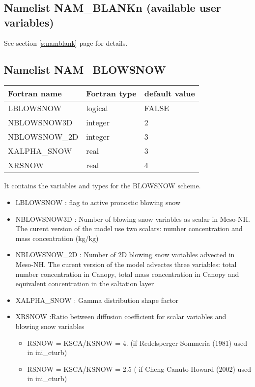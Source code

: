 \subsection{Namelist NAM\_BLANKn (available user variables)}
See section \ref{s:namblank} page \pageref{s:namblank} for details.

\subsection{Namelist NAM\_BLOWSNOW }

\begin{center}
\begin{tabular} {|l|l|l|}
\hline
Fortran name & Fortran type & default value \\
\hline

LBLOWSNOW    & logical & FALSE     \\
NBLOWSNOW3D  & integer & 2         \\
NBLOWSNOW\_2D& integer & 3       \\
XALPHA\_SNOW & real    &3 \\
XRSNOW       & real    & 4\\
\hline
\end{tabular}
\end{center}
It contains the variables and types for the BLOWSNOW scheme.

\begin{itemize}
\item LBLOWSNOW : flag to active pronostic blowing snow 
\item NBLOWSNOW3D : Number of blowing snow variables as scalar in Meso-NH. The curent version of the model use two scalars:
number concentration and mass concentration (kg/kg)
\item NBLOWSNOW\_2D :  Number of 2D blowing snow variables advected in Meso-NH. The curent version of the model advectes three variables: total number concentration in Canopy, total mass concentration in Canopy and equivalent concentration in the saltation layer

\item XALPHA\_SNOW : Gamma distribution shape factor
\item XRSNOW :Ratio between diffusion coefficient for scalar variables and blowing snow variables
\begin{itemize}
	\item RSNOW = KSCA/KSNOW = 4. (if Redelsperger-Sommeria (1981) used in ini\_cturb)
	\item RSNOW = KSCA/KSNOW = 2.5 ( if Cheng-Canuto-Howard (2002) used in ini\_cturb)
\end{itemize}
\end{itemize}

